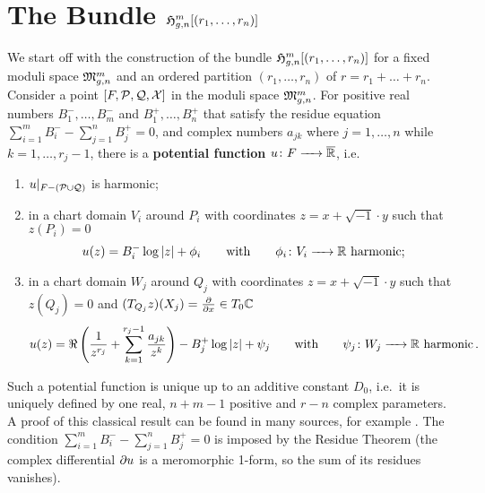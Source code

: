 \section{The Bundle \texorpdfstring{$\Harmr$}{Hmgn[r]}}
\label{cellular_models:from_moduli_spaces_to_parallel_slit_domains}
\label{page:potential_function_parallel}%

We start off with the construction of the bundle $\Harmr$ for a fixed moduli space $\Modspc$ and an ordered partition $(r_1, \ldots, r_n)$ of $r = r_1 + \ldots + r_n$.
Consider a point $[F, \mc P, \mc Q, \mc X]$ in the moduli space $\Modspc$.
For positive real numbers $B_1^-, \ldots, B_m^-$ and $B_1^+, \ldots, B_n^+$ that satisfy the residue equation $\sum_{i=1}^{m} B_i^- - \sum_{j=1}^n B_j^+ = 0$,
and complex numbers $a_{jk}$ where $j = 1, \ldots, n$ while $k = 1, \ldots, r_j-1$, there is a {\bf potential function} $u \colon F \to \ov{\mathbb R}$, i.e.\ 
\begin{enumerate}
    \item $u|_{F - (\mc P \cup \mc Q)}$ is harmonic;
    \item in a chart domain $V_i$ around $P_i$ with coordinates $z = x + \sqrt{-1}\cdot y$ such that $z(P_i) = 0$
        \[
            u(z) = B_i^- \log|z| + \phi_i \mspc{with}{20} \phi_i \colon V_i \to \mathbb R \text{ harmonic};
        \]
    \item in a chart domain $W_j$ around $Q_j$ with coordinates $z = x + \sqrt{-1}\cdot y$ such that $z(Q_j) = 0$ and $(T_{Q_j}z) (X_j) = \frac{\del}{\del x} \in T_0\mathbb C$
        \[
            u(z) = \Re \left( \frac{1}{z^{r_j}} + \sum_{k=1}^{r_j-1} \frac{a_{jk}}{z^k} \right) - B_j^+ \log|z| + \psi_j \mspc{with}{20} \psi_j \colon W_j \to \mathbb R \text{ harmonic} \,.
        \]
\end{enumerate}
Such a potential function is unique up to an additive constant $D_0$, i.e.\
it is uniquely defined by one real, $n+m-1$ positive and $r-n$ complex parameters.
A proof of this classical result can be found in many sources, for example \cite{Koch199105}.
The condition $\sum_{i=1}^{m} B_i^- - \sum_{j=1}^n B_j^+ = 0$ is imposed by the Residue Theorem
(the complex differential $\del u$ is a meromorphic 1-form, so the sum of its residues vanishes).


